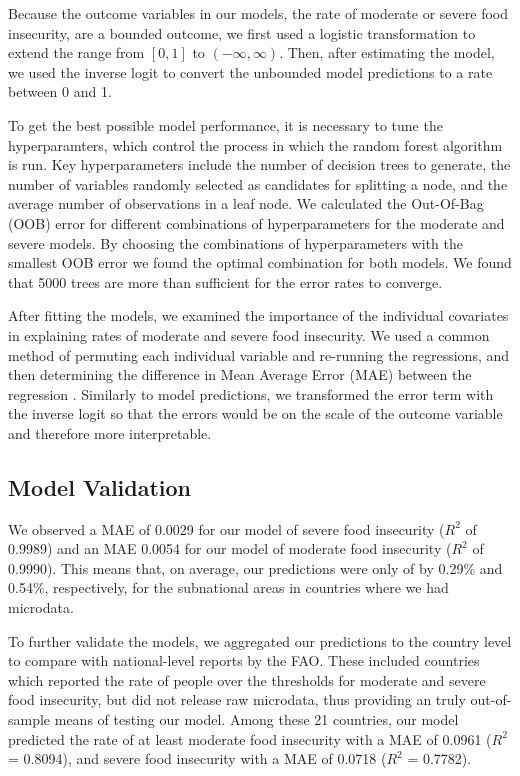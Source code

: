 \documentclass{article}
\begin{document}
Because the outcome variables in our models, the rate of moderate or severe food insecurity, are a bounded outcome, we first used a logistic transformation to extend the range from $[0,1]$ to $(-\infty, \infty)$.  Then, after estimating the model, we used the inverse logit to convert the unbounded model predictions to a rate between 0 and 1.

To get the best possible model performance, it is necessary to tune the hyperparamters, which control the process in which the random forest algorithm is run.  Key hyperparameters include the number of decision trees to generate, the number of variables randomly selected as candidates for splitting a node, and the average number of observations in a leaf node.  We calculated the Out-Of-Bag (OOB) error for different combinations of hyperparameters for the moderate and severe models. By choosing the combinations of hyperparameters with the smallest OOB error we found the optimal combination for both models. We found that 5000 trees are more than sufficient for the error rates to converge.

After fitting the models, we examined the importance of the individual covariates in explaining rates of moderate and severe food insecurity. We used a common method of permuting each individual variable and re-running the regressions, and then determining the difference in Mean Average Error (MAE) between the regression \citep{ishwaran2007variable}.  Similarly to model predictions, we transformed the error term with the inverse logit so that the errors would be on the scale of the outcome variable and therefore more interpretable.

\subsection{Model Validation}
We observed a MAE of 0.0029 for our model of severe food insecurity ($R^2$ of 0.9989) and an MAE 0.0054 for our model of moderate food insecurity ($R^2$ of 0.9990).  This means that, on average, our predictions were only of by 0.29\% and 0.54\%, respectively, for the subnational areas in countries where we had microdata. 

To further validate the models, we aggregated our predictions to the country level to compare with national-level reports by the FAO.  These included countries which reported the rate of people over the thresholds for moderate and severe food insecurity, but did not release raw microdata, thus providing an truly out-of-sample means of testing our model.  Among these 21 countries, our model predicted the rate of at least moderate food insecurity with a MAE of 0.0961 ($R^2$ = 0.8094), and severe food insecurity with a MAE of 0.0718 ($R^2$ = 0.7782).
\end{document}
